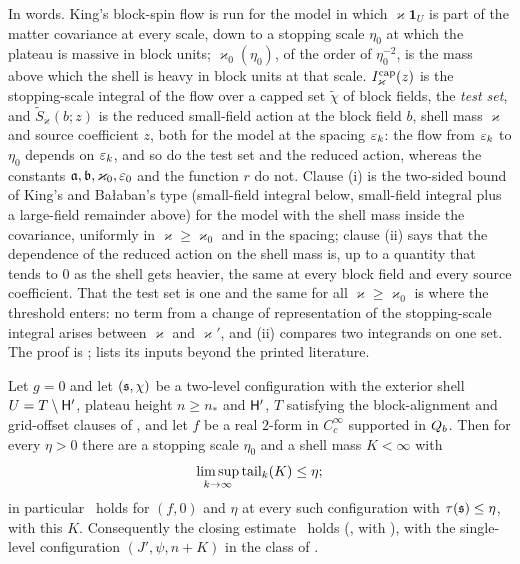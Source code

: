 In words. King's block-spin flow \cite[\S3]{K1} is run for the model in which $\varkappa\mathbf 1_U$ is part of the matter covariance at every scale, down to a stopping scale $\eta_0$ at which the plateau is massive in block units; $\varkappa_0(\eta_0)$, of the order of $\eta_0^{-2}$, is the mass above which the shell is heavy in block units at that scale. $I^{\mathrm{cap}}_\varkappa(z)$ is the stopping-scale integral of the flow over a capped set $\tilde\chi$ of block fields, the \emph{test set}, and $\tilde S_\varkappa(b;z)$ is the reduced small-field action at the block field $b$, shell mass $\varkappa$ and source coefficient $z$, both for the model at the spacing $\varepsilon_k$: the flow from $\varepsilon_k$ to $\eta_0$ depends on $\varepsilon_k$, and so do the test set and the reduced action, whereas the constants $\mathfrak a,\mathfrak b,\varkappa_0,\varepsilon_0$ and the function $r$ do not. Clause (i) is the two-sided bound of King's and Ba{\l}aban's type (small-field integral below, small-field integral plus a large-field remainder above) for the model with the shell mass inside the covariance, uniformly in $\varkappa\ge\varkappa_0$ and in the spacing; clause (ii) says that the dependence of the reduced action on the shell mass is, up to a quantity that tends to $0$ as the shell gets heavier, the same at every block field and every source coefficient. That the test set is one and the same for all $\varkappa\ge\varkappa_0$ is where the threshold enters: no term from a change of representation of the stopping-scale integral arises between $\varkappa$ and $\varkappa'$, and (ii) compares two integrands on one set. The proof is ;  lists its inputs beyond the printed literature.

\begin{theorem}\label{rot:thm:shell}
Let $g=0$ and let $(\mathfrak s,\chi)$ be a two-level configuration with the exterior shell $U=T\setminus\mathsf H'$, plateau height $n\ge n_*$ and $\mathsf H'$, $T$ satisfying the block-alignment and grid-offset clauses of , and let $f$ be a real $2$-form in $C^\infty_c$ supported in $Q_{b}$. Then for every $\eta>0$ there are a stopping scale $\eta_0$ and a shell mass $K<\infty$ with
\[
\limsup_{k\to\infty}\operatorname{tail}_k(K)\le\eta ;
\]
in particular \REz\ holds for $(f,0)$ and $\eta$ at every such configuration with $\tau(\mathfrak s)\le\eta$, with this $K$. Consequently the closing estimate \TIz\ holds (, with ), with the single-level configuration $(J',\psi,n+K)$ in the class of .
\end{theorem}

